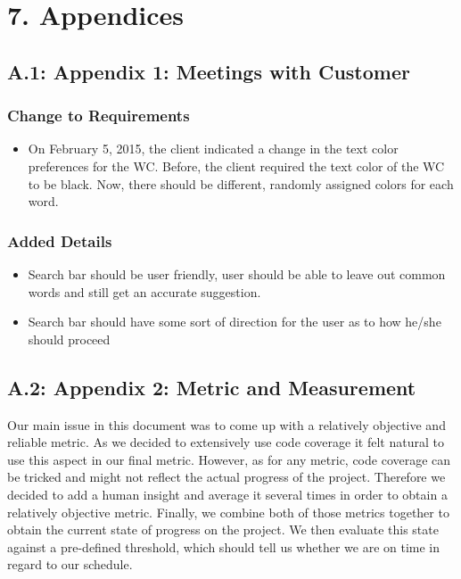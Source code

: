 \documentclass[]{article}
\begin{document}
\section{7. Appendices}\label{appendices}

\subsection{A.1: Appendix 1: Meetings with
Customer}\label{a.1-appendix-1-meetings-with-customer}

\subsubsection{Change to Requirements}\label{change-to-requirements}

\begin{itemize}
\itemsep1pt\parskip0pt
\item
  On February 5, 2015, the client indicated a change in the text color
  preferences for the WC. Before, the client required the text color of
  the WC to be black. Now, there should be different, randomly assigned
  colors for each word.
\end{itemize}

\subsubsection{Added Details}\label{added-details}

\begin{itemize}
\itemsep1pt\parskip0pt
\item
  Search bar should be user friendly, user should be able to leave out
  common words and still get an accurate suggestion.
\item
  Search bar should have some sort of direction for the user as to how
  he/she should proceed
\end{itemize}

\subsection{A.2: Appendix 2: Metric and
Measurement}\label{a.2-appendix-2-metric-and-measurement}
Our main issue in this document was to come up with a relatively objective and reliable metric. As we decided to extensively use code coverage it felt natural to use this aspect in our final metric. However, as for any metric, code coverage can be tricked and might not reflect the actual progress of the project. Therefore we decided to add a human insight and average it several times in order to obtain a relatively objective metric. Finally, we combine both of those metrics together to obtain the current state of progress on the project. We then evaluate this state against a pre-defined threshold, which should tell us whether we are on time in regard to our schedule.
\end{document}
